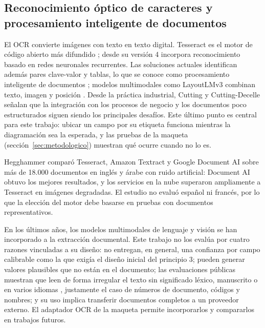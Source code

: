 \documentclass[11pt,a4paper]{article}
\begin{document}
\subsection{Reconocimiento óptico de caracteres y procesamiento inteligente de documentos}
El OCR convierte imágenes con texto en texto digital. Tesseract es el motor de código abierto más difundido \cite{smith2007}; desde su versión 4 incorpora reconocimiento basado en redes neuronales recurrentes. Las soluciones actuales identifican además pares clave-valor y tablas, lo que se conoce como procesamiento inteligente de documentos \cite{cui2021}; modelos multimodales como LayoutLMv3 combinan texto, imagen y posición \cite{huang2022}. Desde la práctica industrial, Cutting y Cutting-Decelle \cite{cutting2021} señalan que la integración con los procesos de negocio y los documentos poco estructurados siguen siendo los principales desafíos. Este último punto es central para este trabajo: ubicar un campo por su etiqueta funciona mientras la diagramación sea la esperada, y las pruebas de la maqueta (sección~\ref{sec:metodologico}) muestran qué ocurre cuando no lo es.

Hegghammer \cite{hegghammer2022} comparó Tesseract, Amazon Textract y Google Document AI sobre más de 18.000 documentos en inglés y árabe con ruido artificial: Document AI obtuvo los mejores resultados, y los servicios en la nube superaron ampliamente a Tesseract en imágenes degradadas. El estudio no evaluó español ni francés, por lo que la elección del motor debe basarse en pruebas con documentos representativos.

En los últimos años, los modelos multimodales de lenguaje y visión se han incorporado a la extracción documental. Este trabajo no los evalúa por cuatro razones vinculadas a su diseño: no entregan, en general, una confianza por campo calibrable como la que exigía el diseño inicial del principio 3; pueden generar valores plausibles que no están en el documento; las evaluaciones públicas muestran que leen de forma irregular el texto sin significado léxico, manuscrito o en varios idiomas \cite{ocrbench2024}, justamente el caso de números de documento, códigos y nombres; y su uso implica transferir documentos completos a un proveedor externo. El adaptador OCR de la maqueta permite incorporarlos y compararlos en trabajos futuros.
\end{document}
